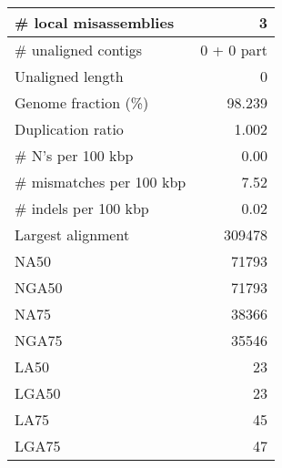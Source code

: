 \documentclass[12pt,a4paper]{article}
\begin{document}
\begin{table}[ht]
\begin{center}
\begin{tabular}{|l*{1}{|r}|}
\# local misassemblies & 3 \\ \hline
\# unaligned contigs & 0 + 0 part \\ \hline
Unaligned length & 0 \\ \hline
Genome fraction (\%) & 98.239 \\ \hline
Duplication ratio & 1.002 \\ \hline
\# N's per 100 kbp & 0.00 \\ \hline
\# mismatches per 100 kbp & 7.52 \\ \hline
\# indels per 100 kbp & 0.02 \\ \hline
Largest alignment & 309478 \\ \hline
NA50 & 71793 \\ \hline
NGA50 & 71793 \\ \hline
NA75 & 38366 \\ \hline
NGA75 & 35546 \\ \hline
LA50 & 23 \\ \hline
LGA50 & 23 \\ \hline
LA75 & 45 \\ \hline
LGA75 & 47 \\ \hline
\end{tabular}
\end{center}
\end{table}
\end{document}
